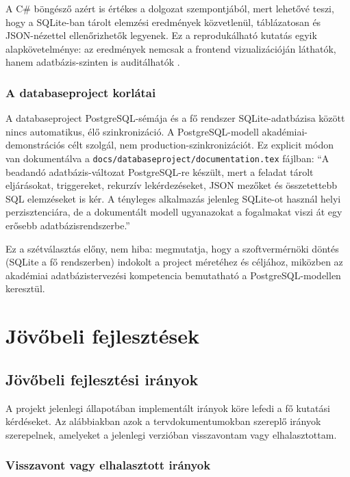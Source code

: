 ﻿\documentclass[a4paper,12pt]{report}
\begin{document}
A C\# böngésző azért is értékes a dolgozat szempontjából, mert lehetővé teszi, hogy a SQLite-ban tárolt elemzési eredmények közvetlenül, táblázatosan és JSON-nézettel ellenőrizhetők legyenek. Ez a reprodukálható kutatás egyik alapkövetelménye: az eredmények nemcsak a frontend vizualizációján láthatók, hanem adatbázis-szinten is auditálhatók \cite{sandve2013}.

\subsection{A databaseproject korlátai}

A databaseproject PostgreSQL-sémája és a fő rendszer SQLite-adatbázisa között nincs automatikus, élő szinkronizáció. A PostgreSQL-modell akadémiai-demonstrációs célt szolgál, nem production-szinkronizációt. Ez explicit módon van dokumentálva a \texttt{docs/databaseproject/documentation.tex} fájlban: ``A beadandó adatbázis-változat PostgreSQL-re készült, mert a feladat tárolt eljárásokat, triggereket, rekurzív lekérdezéseket, JSON mezőket és összetettebb SQL elemzéseket is kér. A tényleges alkalmazás jelenleg SQLite-ot használ helyi perzisztenciára, de a dokumentált modell ugyanazokat a fogalmakat viszi át egy erősebb adatbázisrendszerbe.''

Ez a szétválasztás előny, nem hiba: megmutatja, hogy a szoftvermérnöki döntés (SQLite a fő rendszerben) indokolt a project méretéhez és céljához, miközben az akadémiai adatbázistervezési kompetencia bemutatható a PostgreSQL-modellen keresztül.

\chapter{Jövőbeli fejlesztések}

\section{Jövőbeli fejlesztési irányok}

A projekt jelenlegi állapotában implementált irányok köre lefedi a fő kutatási kérdéseket. Az alábbiakban azok a tervdokumentumokban szereplő irányok szerepelnek, amelyeket a jelenlegi verzióban visszavontam vagy elhalasztottam.

\subsection{Visszavont vagy elhalasztott irányok}
\end{document}
